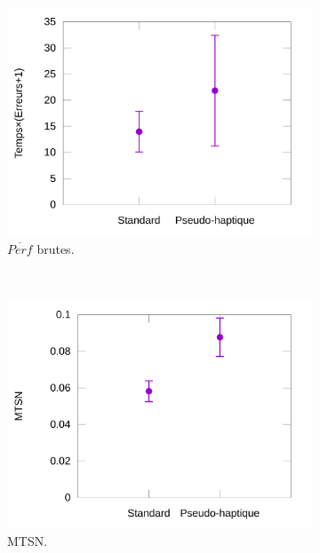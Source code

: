 \begin{figure}[!htb]
\begin{subfigure}[t]{0.49\textwidth}
			\includegraphics[width=\textwidth]{figures/ch5/phSpRawProducts}
			\caption{$\overline{Perf}$ brutes.}
			\label{fig:phSpRawProducts}
		\end{subfigure}
		~
		\begin{subfigure}[t]{0.49\textwidth}
			\centering
			\includegraphics[width=\textwidth]{figures/ch5/phSpNormTimes}
			\caption{MTSN.}
			\label{fig:phSpNormTimes}
		\end{subfigure}
				~
		\begin{subfigure}[t]{0.49\textwidth}
			\centering

\end{subfigure}
\end{figure}
